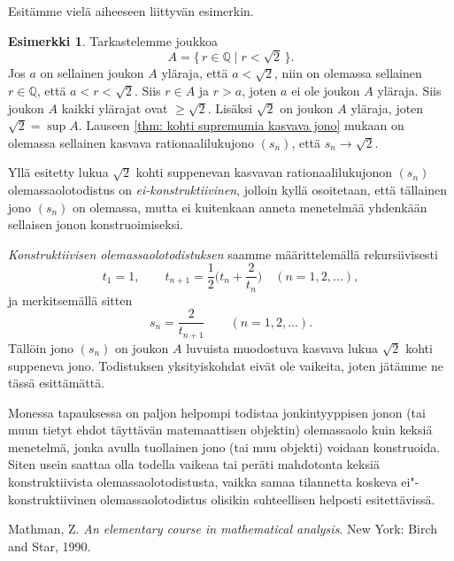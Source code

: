 \documentclass[a4paper,12pt,leqno,oneside]{report} %
\theoremstyle{plain}
\theoremstyle{definition}
\newtheorem{esimerkki}{Esimerkki}[chapter]
\theoremstyle{remark}
\numberwithin{equation}{chapter}
\newcommand*{\Qset}{\mathbb{Q}}  %
\begin{document}
Esitämme vielä aiheeseen liittyvän esimerkin.

\begin{esimerkki}
Tarkastelemme joukkoa
\[
    A = \{\, r\in\Qset \mid r < \sqrt{2} \,\}.
\]
Jos $a$ on sellainen joukon $A$ yläraja, että $a < \sqrt{2}$, niin on olemassa sellainen $r\in\Qset$, että $a < r < \sqrt{2}$. Siis $r\in A$ ja $r > a$, joten $a$ ei ole joukon $A$ yläraja. Siis joukon $A$ kaikki ylärajat ovat $\ge \sqrt{2}$. Lisäksi $\sqrt{2}$ on joukon $A$ yläraja, joten $\sqrt{2} = \sup A$. Lauseen \ref{thm: kohti supremumia kasvava jono} mukaan on olemassa sellainen kasvava rationaalilukujono $(s_n)$, että $s_n\to\sqrt{2}$.

Yllä esitetty lukua $\sqrt{2}$ kohti suppenevan kasvavan rationaalilukujonon $(s_n)$ olemassaolotodistus on \emph{ei-konstruktiivinen}, jolloin kyllä osoitetaan, että tällainen jono $(s_n)$ on olemassa, mutta ei kuitenkaan anneta menetelmää yhdenkään sellaisen jonon konstruoimiseksi.

\emph{Konstruktiivisen olemassaolotodistuksen} saamme määrittelemällä rekursiivisesti
\[
    t_1 = 1, \qquad
    t_{n+1} = \frac{1}{2}\biggl(t_n+\frac{2}{t_n}\biggr)
    \quad (n = 1,2,\dots),
\]
ja merkitsemällä sitten
\[
    s_n = \frac{2}{t_{n+1}} \qquad (n = 1,2,\dots).
\]
Tällöin jono $(s_n)$ on joukon $A$ luvuista muodostuva kasvava lukua $\sqrt{2}$ kohti suppeneva jono. Todistuksen yksityiskohdat eivät ole vaikeita, joten jätämme ne tässä esittämättä.
\end{esimerkki}

Monessa tapauksessa on paljon helpompi todistaa jonkintyyppisen jonon (tai muun tietyt ehdot täyttävän matemaattisen objektin) olemassaolo kuin keksiä menetelmä, jonka avulla tuollainen jono (tai muu objekti) voidaan konstruoida. Siten usein saattaa olla todella vaikeaa tai peräti mahdotonta keksiä konstruktiivista olemassaolotodistusta, vaikka samaa tilannetta koskeva ei"-konstruktiivinen olemassaolotodistus olisikin suhteellisen helposti esitettävissä.


\begin{thebibliography}{9}

Mathman, Z. \emph{An elementary course in mathematical analysis}.
New York: Birch and Star, 1990.

\end{thebibliography}
\end{document}

